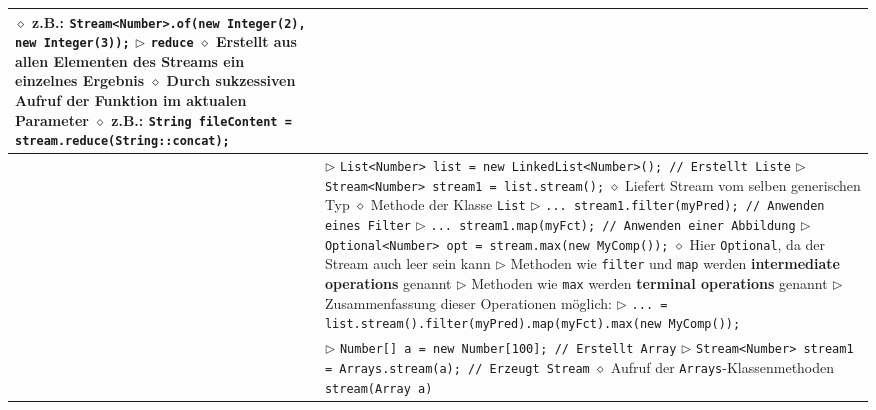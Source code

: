 \begin{tabular}{ | p{} p{} | }
{	\hspace{0.4cm} $\diamond$ z.B.: \texttt{Stream<Number>.of(new Integer(2), new Integer(3));} \\
	$\triangleright$ \texttt{reduce} \\
	\hspace{0.4cm} $\diamond$ Erstellt aus allen Elementen des Streams ein einzelnes Ergebnis \\
	\hspace{0.4cm} $\diamond$ Durch sukzessiven Aufruf der Funktion im aktualen Parameter \\
	\hspace{0.4cm} $\diamond$ z.B.: \texttt{String fileContent = stream.reduce(String::concat);} } \\ \hline

	\makecell[l]{Stream aus Liste} & \makecell[l]{
	$\triangleright$ \texttt{List<Number> list = new LinkedList<Number>(); // Erstellt Liste}	\\
	$\triangleright$ \texttt{Stream<Number> stream1 = list.stream();} \\
	\hspace{0.4cm} $\diamond$ Liefert Stream vom selben generischen Typ \\
	\hspace{0.4cm} $\diamond$ Methode der Klasse \texttt{List} \\
	$\triangleright$ \texttt{... stream1.filter(myPred); // Anwenden eines Filter} \\
	$\triangleright$ \texttt{... stream1.map(myFct); // Anwenden einer Abbildung} \\
	$\triangleright$ \texttt{Optional<Number> opt = stream.max(new MyComp());} \\
	\hspace{0.4cm} $\diamond$ Hier \texttt{Optional}, da der Stream auch leer sein kann \\
	$\triangleright$ Methoden wie \texttt{filter} und \texttt{map} werden \textbf{intermediate operations} genannt \\
	$\triangleright$ Methoden wie \texttt{max} werden \textbf{terminal operations} genannt \\
	$\triangleright$ Zusammenfassung dieser Operationen möglich: \\
	$\triangleright$ \texttt{... =  list.stream().filter(myPred).map(myFct).max(new MyComp());} } \\ \hline

	\makecell[l]{Stream aus Array} & \makecell[l]{
	$\triangleright$ \texttt{Number[] a = new Number[100]; // Erstellt Array} \\
	$\triangleright$ \texttt{Stream<Number> stream1 = Arrays.stream(a); // Erzeugt Stream} \\
	\hspace{0.4cm} $\diamond$ Aufruf der \texttt{Arrays}-Klassenmethoden \texttt{stream(Array a)} } \\ \hline


\end{tabular}
